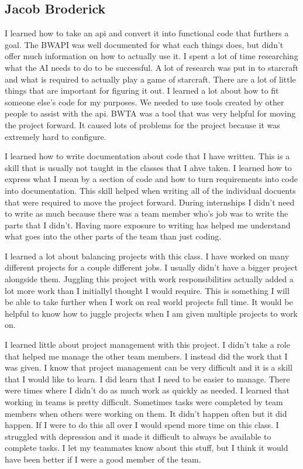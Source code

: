 \documentclass[10pt,letterpaper,onecolumn,draftclsnofoot]{IEEEtran}
\begin{document}
\subsection{Jacob Broderick}
I learned how to take an api and convert it into functional code that furthers a goal. The BWAPI was well documented for what each things does, but didn't offer much information on how to actually use it. I spent a lot of time researching what the AI needs to do to be successful. A lot of research was put in to starcraft and what is required to actually play a game of starcraft. There are a lot of little things that are important for figuring it out. I learned a lot about how to fit someone else's code for my purposes. We needed to use tools created by other people to assist with the api. BWTA was a tool that was very helpful for moving the project forward. It caused lots of problems for the project because it was extremely hard to configure. 

I learned how to write documentation about code that I have written. This is a skill that is usually not taught in the classes that I ahve taken. I learned how to express what I mean by a section of code and how to turn requirements into code into documentation. This skill helped when writing all of the individual docuents that were required to move the project forward. During internships I didn't need to write as much because there was a team member who's job was to write the parts that I didn't. Having more exposure to writing has helped me understand what goes into the other parts of the team than just coding.

I learned a lot about balancing projects with this class. I have worked on many different projects for a couple different jobs. I usually didn't have a bigger project alongside them. Juggling this project with work responsibilities actually added a lot more work than I initiallyl thought I would require. This is something I will be able to take further when I work on real world projects full time. It would be helpful to know how to juggle projects when I am given multiple projects to work on.

I learned little about project management with this project. I didn't take a role that helped me manage the other team members. I instead did the work that I was given. I know that project management can be very difficult and it is a skill that I would like to learn. I did learn that I need to be easier to manage. There were times where I didn't do as much work as quickly as needed.
I learned that working in teams is pretty difficult. Sometimes tasks were completed by team members when others were working on them. It didn't happen often but it did happen. If I were to do this all over I would spend more time on this class. I struggled with depression and it made it difficult to always be available to complete tasks. I let my teammates know about this stuff, but I think it would have been better if I were a good member of the team.
\newpage
\end{document}
